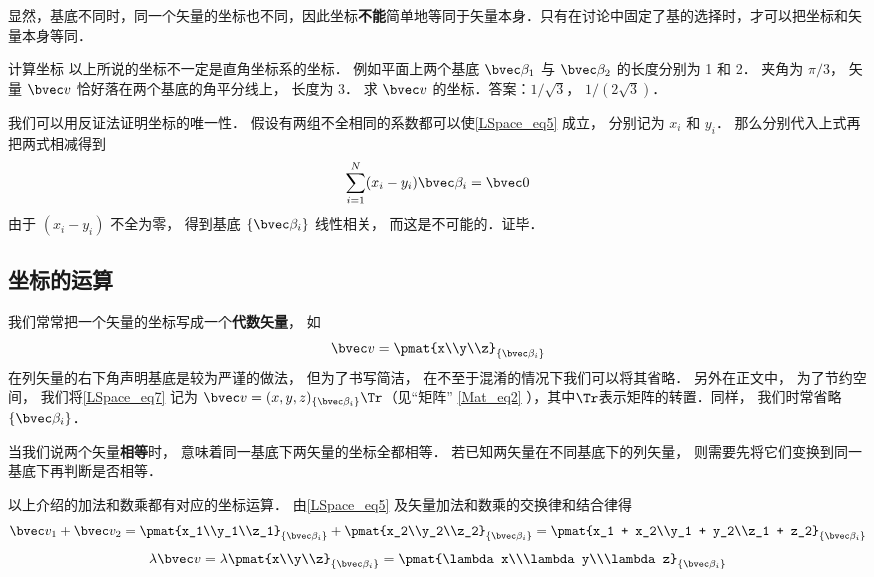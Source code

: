显然，基底不同时，同一个矢量的坐标也不同，因此坐标\textbf{不能}简单地等同于矢量本身．只有在讨论中固定了基的选择时，才可以把坐标和矢量本身等同．

\begin{exercise}{计算坐标}
以上所说的坐标不一定是直角坐标系的坐标． 例如平面上两个基底 $\bvec \beta_1$ 与 $\bvec \beta_2$ 的长度分别为 1 和 2． 夹角为 $\pi/3$， 矢量 $\bvec v$ 恰好落在两个基底的角平分线上， 长度为 3． 求 $\bvec v$ 的坐标．答案：$1/\sqrt 3$， $1/(2\sqrt 3)$．
\end{exercise}

我们可以用反证法证明坐标的唯一性． 假设有两组不全相同的系数都可以使\autoref{LSpace_eq5} 成立， 分别记为 $x_i$ 和 $y_i$． 那么分别代入上式再把两式相减得到
\begin{equation}
\sum_{i=1}^N (x_i-y_i) \bvec \beta_i = \bvec 0
\end{equation}
由于 $(x_i-y_i)$ 不全为零， 得到基底 $\{\bvec \beta_i\}$ 线性相关， 而这是不可能的．证毕．

\subsection{坐标的运算}
我们常常把一个矢量的坐标写成一个\textbf{代数矢量}， 如
\begin{equation}\label{LSpace_eq7}
\bvec v = \pmat{x\\y\\z}_{\{\bvec\beta_i\}}
\end{equation}
在列矢量的右下角声明基底是较为严谨的做法， 但为了书写简洁， 在不至于混淆的情况下我们可以将其省略． 另外在正文中， 为了节约空间， 我们将\autoref{LSpace_eq7} 记为 $\bvec v = (x, y, z)_{\{\bvec\beta_i\}}\Tr$（见“矩阵” \autoref{Mat_eq2} ），其中$\Tr$表示矩阵的转置．同样， 我们时常省略 $\{\bvec\beta_i\}$．

当我们说两个矢量\textbf{相等}时， 意味着同一基底下两矢量的坐标全都相等． 若已知两矢量在不同基底下的列矢量， 则需要先将它们变换到同一基底下再判断是否相等．

以上介绍的加法和数乘都有对应的坐标运算． 由\autoref{LSpace_eq5} 及矢量加法和数乘的交换律和结合律得
\begin{equation}\label{LSpace_eq8}
\bvec v_1 + \bvec v_2 = \pmat{x_1\\y_1\\z_1}_{\{\bvec\beta_i\}} + \pmat{x_2\\y_2\\z_2}_{\{\bvec\beta_i\}} = \pmat{x_1 + x_2\\y_1 + y_2\\z_1 + z_2}_{\{\bvec\beta_i\}}
\end{equation}
\begin{equation}\label{LSpace_eq9}
\lambda \bvec v = \lambda\pmat{x\\y\\z}_{\{\bvec\beta_i\}} = \pmat{\lambda x\\\lambda y\\\lambda z}_{\{\bvec\beta_i\}}
\end{equation}

